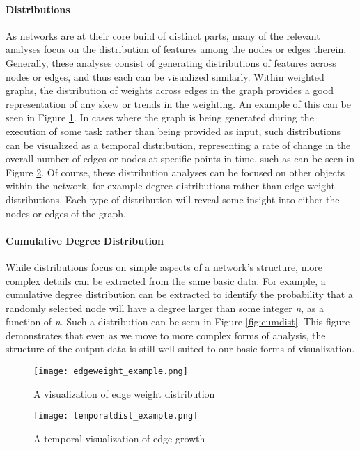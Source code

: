 \paragraph{Distributions}
As networks are at their core build of distinct parts, many of the relevant analyses focus on the distribution of features among the nodes or edges therein. Generally, these analyses consist of generating distributions of features across nodes or edges, and thus each can be visualized similarly. Within weighted graphs, the distribution of weights across edges in the graph provides a good representation of any skew or trends in the weighting. An example of this can be seen in Figure \ref{fig:edgeweight}. In cases where the graph is being generated during the execution of some task rather than being provided as input, such distributions can be visualized as a temporal distribution, representing a rate of change in the overall number of edges or nodes at specific points in time, such as can be seen in Figure \ref{fig:temporaldist}. Of course, these distribution analyses can be focused on other objects within the network, for example degree distributions rather than edge weight distributions. Each type of distribution will reveal some insight into either the nodes or edges of the graph. 

\paragraph{Cumulative Degree Distribution}
While distributions focus on simple aspects of a network's structure, more complex details can be extracted from the same basic data. For example, a cumulative degree distribution can be extracted to identify the probability that a randomly selected node will have a degree larger than some integer \emph{n}, as a function of \emph{n}. Such a distribution can be seen in Figure \ref{fig:cumdist}. This figure demonstrates that even as we move to more complex forms of analysis, the structure of the output data is still well suited to our basic forms of visualization. 

\begin{figure}
	\centering
	\texttt{[image: edgeweight\_example.png]}
	\caption{A visualization of edge weight distribution \cite{KONECT}}
	\label{fig:edgeweight}
\end{figure}

\begin{figure}
	\centering
	\texttt{[image: temporaldist\_example.png]}
	\caption{A temporal visualization of edge growth \cite{KONECT}}
	\label{fig:temporaldist}
\end{figure}

